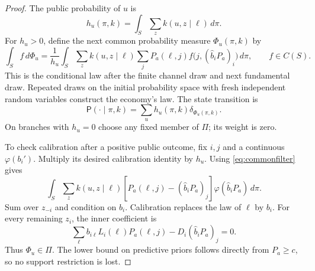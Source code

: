 \documentclass[11pt,a4paper]{article}
\newcommand{\dd}{\,d}
\begin{document}
\begin{proof}
The public probability of $u$ is
\[
 h_u(\pi,k)=\int_S\sum_zk(u,z\mid\ell)\dd\pi.
\]
For $h_u>0$, define the next common probability measure $\Phi_u(\pi,k)$ by
\begin{equation}\label{eq:commonfilter}
 \int_S f\dd\Phi_u
 =\frac1{h_u}\int_S\sum_zk(u,z\mid\ell)
       \sum_{j}P_a(\ell,j)
       f\bigl(j,(\widehat b_iP_a)_i\bigr)\dd\pi,
 \qquad f\in C(S).
\end{equation}
This is the conditional law after the finite channel draw and next fundamental
draw. Repeated draws on the initial probability space with fresh independent
random variables construct the economy's law. The state transition is
\begin{equation}\label{eq:kernel}
 \mathsf P(\cdot\mid\pi,k)=\sum_u h_u(\pi,k)\delta_{\Phi_u(\pi,k)}.
\end{equation}
On branches with $h_u=0$ choose any fixed member of $\Pi$; its weight is zero.

To check calibration after a positive public outcome, fix $i,j$ and a
continuous $\varphi(b_i')$. Multiply its desired calibration identity by $h_u$.
Using \eqref{eq:commonfilter} gives
\[
 \int_S\sum_zk(u,z\mid\ell)
 [P_a(\ell,j)-(\widehat b_iP_a)_j]
 \varphi(\widehat b_iP_a)\dd\pi.
\]
Sum over $z_{-i}$ and condition on $b_i$. Calibration replaces the law of
$\ell$ by $b_i$. For every remaining $z_i$, the inner coefficient is
\[
 \sum_\ell b_{i\ell}L_i(\ell)P_a(\ell,j)
       -D_i(\widehat b_iP_a)_j=0.
\]
Thus $\Phi_u\in\Pi$. The lower bound on predictive priors follows directly
from $P_a\geq c$, so no support restriction is lost.


\end{proof}
\end{document}
